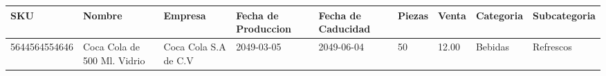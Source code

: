 \documentclass[a4paper,11pt]{article}
\begin{document}
\footnotesize  
\setlength\LTleft{-50pt} 
\setlength\LTright{-100pt}  
\begin{landscape} 
\thispagestyle{empty}
\begin{longtable}{|p{4cm}|p{2.5cm}|p{2.5cm}|p{1.5cm}|p{1.5cm}|p{2.5cm}|p{1cm}|p{3cm}|p{3cm}||}
\hline 
\hline
\textbf{SKU} & \textbf{Nombre} & \textbf{Empresa} & \textbf{Fecha de Produccion} & \textbf{Fecha de Caducidad} & \textbf{Piezas} & \textbf{Venta} & \textbf{Categoria} & \textbf{Subcategoria}\\ \hline \hline5644564554646 & Coca Cola de 500 Ml. Vidrio & Coca Cola S.A de C.V & 2049-03-05 & 2049-06-04 & 50 & 12.00 & Bebidas & Refrescos \\ \hline 
\end{longtable}
\thispagestyle{empty}
\end{landscape}
\end{document}
